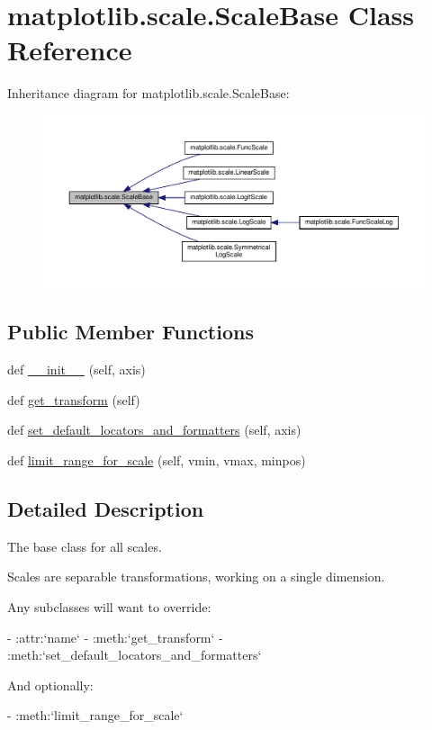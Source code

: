 \hypertarget{classmatplotlib_1_1scale_1_1ScaleBase}{}\section{matplotlib.\+scale.\+Scale\+Base Class Reference}
\label{classmatplotlib_1_1scale_1_1ScaleBase}


Inheritance diagram for matplotlib.\+scale.\+Scale\+Base\+:
\nopagebreak
\begin{figure}[H]
\begin{center}
\leavevmode
\includegraphics[width=350pt]{classmatplotlib_1_1scale_1_1ScaleBase__inherit__graph}
\end{center}
\end{figure}
\subsection*{Public Member Functions}
\begin{DoxyCompactItemize}
\item 
def \hyperlink{classmatplotlib_1_1scale_1_1ScaleBase_a456a86d8e26a298462ae1dcc5a4dfa78}{\+\_\+\+\_\+init\+\_\+\+\_\+} (self, axis)
\item 
def \hyperlink{classmatplotlib_1_1scale_1_1ScaleBase_acf648f9d8a75c9acd5d89dbbca10668c}{get\+\_\+transform} (self)
\item 
def \hyperlink{classmatplotlib_1_1scale_1_1ScaleBase_aa483d098bc7dfb64f6b9e799c14f377a}{set\+\_\+default\+\_\+locators\+\_\+and\+\_\+formatters} (self, axis)
\item 
def \hyperlink{classmatplotlib_1_1scale_1_1ScaleBase_ad39a31685b8be84d28b9f257ab94569b}{limit\+\_\+range\+\_\+for\+\_\+scale} (self, vmin, vmax, minpos)
\end{DoxyCompactItemize}


\subsection{Detailed Description}
\begin{DoxyVerb}The base class for all scales.

Scales are separable transformations, working on a single dimension.

Any subclasses will want to override:

- :attr:`name`
- :meth:`get_transform`
- :meth:`set_default_locators_and_formatters`

And optionally:

- :meth:`limit_range_for_scale`\end{DoxyVerb}
 

